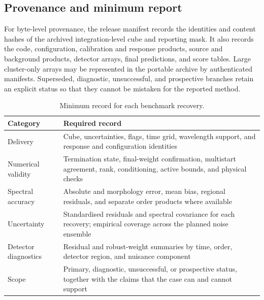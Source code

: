 \subsection{Provenance and minimum report}

For byte-level provenance, the release manifest records the identities and
content hashes of the archived integration-level cube and reporting mask. It
also records the code, configuration, calibration and response products,
source and background products, detector arrays, final predictions, and score
tables. Large cluster-only arrays may be represented in the portable archive
by authenticated manifests. Superseded, diagnostic, unsuccessful, and
prospective branches retain an explicit status so that they cannot be mistaken
for the reported method.

\begin{table}[t]
 \centering
 \footnotesize
 \caption{Minimum record for each benchmark recovery.}
 \label{tab:benchmark-report}
 \setlength{\tabcolsep}{3pt}
 \begin{tabularx}{0.97\columnwidth}{@{}>{\raggedright\arraybackslash}p{}>{\raggedright\arraybackslash}X@{}}
  \toprule
  Category & Required record \\
  \midrule
  Delivery & Cube, uncertainties, flags, time grid, wavelength support, and
  response and configuration identities \\
  Numerical validity & Termination state, final-weight confirmation,
  multistart agreement, rank, conditioning, active bounds, and physical checks \\
  Spectral accuracy & Absolute and morphology error, mean bias, regional
  residuals, and separate order products where available \\
  Uncertainty & Standardised residuals and spectral covariance for each
  recovery; empirical coverage across the planned noise ensemble \\
  Detector diagnostics & Residual and robust-weight summaries by time, order,
  detector region, and nuisance component \\
  Scope & Primary, diagnostic, unsuccessful, or prospective status, together
  with the claims that the case can and cannot support \\
  \bottomrule
 \end{tabularx}
\end{table}

